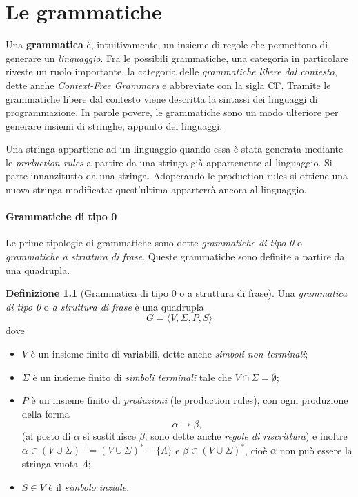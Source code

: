\documentclass[10pt]{\classname}
\theoremstyle{newlinethm}
\theoremstyle{theorem}
\theoremstyle{definition}
\newtheorem{definizione}{Definizione}[section]
\theoremstyle{definition}
\theoremstyle{definition}
\theoremstyle{definition}
\begin{document}
\clearpage

\chapter{Le grammatiche}

Una \textbf{grammatica} è, intuitivamente, un insieme di regole che permettono
di generare un \emph{linguaggio}. Fra le possibili grammatiche, una categoria
in particolare riveste un ruolo importante, la categoria delle
\emph{grammatiche libere dal contesto}, dette anche \emph{Context-Free
Grammars} e abbreviate con la sigla CF. Tramite le grammatiche libere dal contesto viene
descritta la sintassi dei linguaggi di programmazione. In parole povere, le
grammatiche sono un modo ulteriore per generare insiemi di stringhe, appunto
dei linguaggi.

Una stringa appartiene ad un linguaggio quando essa è stata generata mediante
le \emph{production rules} a partire da una stringa già appartenente al
linguaggio. Si parte innanzitutto da una stringa. Adoperando le production
rules si ottiene una nuova stringa modificata: quest'ultima apparterrà ancora
al linguaggio.

\subsubsection{Grammatiche di tipo 0}

Le prime tipologie di grammatiche sono dette \emph{grammatiche di tipo 0} o
\emph{grammatiche a struttura di frase}. Queste grammatiche sono definite a
partire da una quadrupla. 

\begin{definizione}[Grammatica di tipo 0 o a struttura di frase] Una \emph{grammatica di tipo 0} o \emph{a struttura di frase} è una quadrupla $$G = \langle V, \Sigma, P, S\rangle$$ dove 
\begin{itemize}
    \item $V$ è un insieme finito di variabili, dette anche \emph{simboli non terminali}; 
    \item $\Sigma$ è un insieme finito di \emph{simboli terminali} tale che $V \cap \Sigma =
\emptyset$; 
    \item $P$ è un insieme finito di \emph{produzioni} (le production rules), con ogni produzione della forma $$\alpha \rightarrow \beta,$$ (al posto di $\alpha$ si sostituisce $\beta$; sono dette anche \emph{regole di riscrittura}) e inoltre $\alpha \in (V \cup \Sigma)^+ = (V \cup \Sigma)^* - \{\Lambda\}$ e $\beta \in (V \cup \Sigma)^*$, cioè $\alpha$ non può essere la stringa vuota $\Lambda$;
    \item $S \in V$ è il \emph{simbolo inziale}.
\end{itemize}
\end{definizione}
\end{document}
